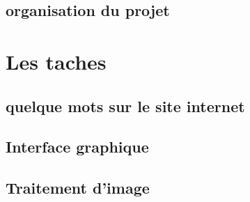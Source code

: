 \documentclass{article}
\begin{document}
\subsection{organisation du projet}
\newpage
\section{Les taches}
\subsection{quelque mots sur le site internet}
\subsection{Interface graphique}
\subsection{Traitement d'image}
\end{document}
